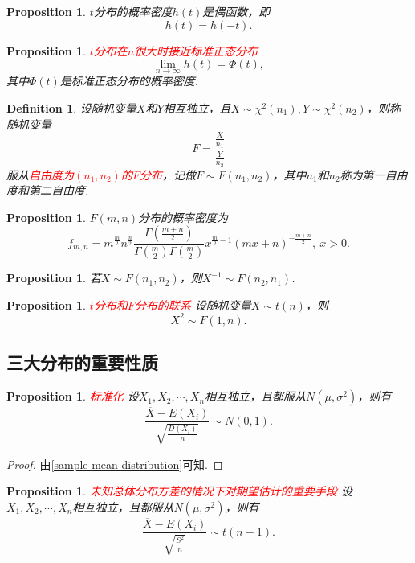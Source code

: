 \documentclass{article}
\newtheorem{proposition}[theorem]{Proposition}
\newtheorem{definition}[theorem]{Definition}
\newcommand{\redt}[1]{\textcolor{red}{#1}}
\begin{document}
\begin{proposition}
\rm $t$分布的概率密度$h(t)$是偶函数，即
$$
h(t)=h(-t).
$$
\end{proposition}

\begin{proposition}
\rm \redt{$t$分布在$n$很大时接近标准正态分布}
$$
\lim\limits_{n \to \infty} h(t) = \Phi(t),
$$
其中$\Phi(t)$是标准正态分布的概率密度. 
\end{proposition}

\begin{definition}
\rm 设随机变量$X$和$Y$相互独立，且$X \sim \chi^2(n_1), Y \sim \chi^2(n_2)$，则称随机变量
$$
F = \frac{\frac{X}{n_1}}{\frac{Y}{n_2}}
$$
服从\redt{自由度为$(n_1,n_2)$的$F$分布}，记做$F \sim F(n_1,n_2)$，其中$n_1$和$n_2$称为第一自由度和第二自由度. 
\end{definition}

\begin{proposition}
\rm $F(m,n)$分布的概率密度为
$$
f_{m,n} = m^{\frac{m}{2}} n^{\frac{n}{2}} \frac{\Gamma(\frac{m+n}{2})}{\Gamma(\frac{m}{2})\Gamma(\frac{m}{2})}x^{\frac{m}{2}-1}(mx+n)^{-\frac{m+n}{2}}, ~ x> 0.
$$
\end{proposition}

\begin{proposition}
\rm 若$X \sim F(n_1,n_2)$，则$X^{-1} \sim F(n_2,n_1)$. 
\end{proposition}

\begin{proposition}
\rm \redt{$t$分布和$F$分布的联系} 设随机变量$X \sim t(n)$，则
$$
X^2 \sim F(1,n). 
$$
\end{proposition}

\subsection{三大分布的重要性质}

\begin{proposition}\label{sample-means-normalization}
\rm \redt{标准化} 设$X_1,X_2,\cdots,X_n$相互独立，且都服从$N(\mu,\sigma^2)$，则有
$$
\frac{\overline{X} - E(X_i)}{\sqrt{\frac{D(X_i)}{n}}} \sim N(0,1).
$$
\end{proposition}

\begin{proof}
\rm 由\ref{sample-mean-distribution}可知.
\end{proof}

\begin{proposition}\label{sample-variance-replace-variance}
\rm \redt{未知总体分布方差的情况下对期望估计的重要手段} 设$X_1,X_2,\cdots,X_n$相互独立，且都服从$N(\mu,\sigma^2)$，则有
$$
\frac{\overline{X} - E(X_i)}{\sqrt{\frac{S^2}{n}}} \sim t(n-1). 
$$
\end{proposition}
\end{document}
